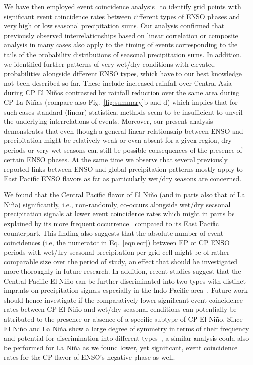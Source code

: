 \documentclass[utf8]{frontiersSCNS} %
\begin{document}
We have then employed event coincidence analysis~\citep{Siegmund2016b,Donges2016a} to identify grid points with significant event coincidence rates between different types of ENSO phases and very high or low seasonal precipitation sums. Our analysis confirmed that previously observed interrelationships based on linear correlation or composite analysis in many cases also apply to the timing of events corresponding to the tails of the probability distributions of seasonal precipitation sums. In addition, we identified further patterns of very wet/dry conditions with elevated probabilities alongside different ENSO types, which have to our best knowledge not been described so far. These include increased rainfall over Central Asia during CP El Ni\~nos contrasted by rainfall reduction over the same area during CP La Ni\~nas (compare also Fig.~\ref{fig:summary}b and d) which implies that for such cases standard (linear) statistical methods seem to be insufficient to unveil the underlying interrelations of events. Moreover, our present analysis demonstrates that even though a general linear relationship between ENSO and precipitation might be relatively weak or even absent for a given region, dry periods or very wet seasons can still be possible consequences of the presence of certain ENSO phases. At the same time we observe that several previously reported links between ENSO and global precipitation patterns mostly apply to East Pacific ENSO flavors as far as particularly wet/dry seasons are concerned. 

We found that the Central Pacific flavor of El Ni\~no (and in parts also that of La Ni\~na) significantly, i.e., non-randomly, co-occurs alongside wet/dry seasonal precipitation signals at lower event coincidence rates which might in parts be explained by its more frequent occurrence~\citep{hendon_prospects_2009,graf_central_2012, preethi2015impacts, wiedermann_climate_2016} compared to its East Pacific counterpart. This finding also suggests that the absolute number of event coincidences (i.e, the numerator in Eq.~\eqref{eqn:ecr}) between EP or CP ENSO periods with wet/dry seasonal precipitation per grid-cell might be of rather comparable size over the period of study, an effect that should be investigated more thoroughly in future research. In addition, recent studies suggest that the Central Pacific El Ni\~no can be further discriminated into two types with distinct imprints on precipitation signals especially in the Indo-Pacific area~\citep{wang2013classifying, wang2014different, wang2018new}. Future work should hence investigate if the comparatively lower significant event coincidence rates between CP El Ni\~no and wet/dry seasonal conditions can potentially be attributed to the presence or absence of a specific subtype of CP El Ni\~no. Since El Ni\~no and La Ni\~na show a large degree of symmetry in terms of their frequency and potential for discrimination into different types~\citep{kao_contrasting_2009, ashok_nino_2007,hidayat2018impact}, a similar analysis could also be performed for La Ni\~na as we found lower, yet significant, event coincidence rates for the CP flavor of ENSO's negative phase as well. 
\end{document}
